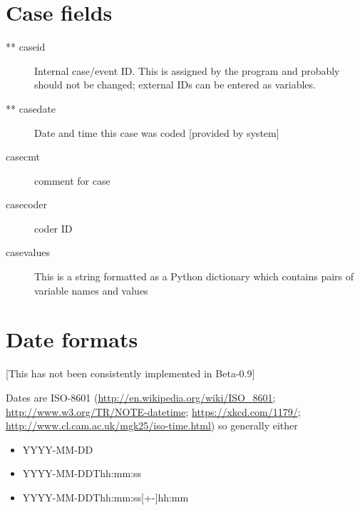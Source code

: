 \documentclass[letterpaper,10pt,english]{sphinxmanual}
\begin{document}
\section{Case fields}
\label{appendix2:case-fields}\begin{description}
\item[{** caseid}] \leavevmode
Internal case/event ID. This is assigned by the program and
probably should not be changed; external IDs can be entered as
variables.

\item[{** casedate}] \leavevmode
Date and time this case was coded {[}provided by system{]}

\item[{casecmt}] \leavevmode
comment for case

\item[{casecoder}] \leavevmode
coder ID

\item[{casevalues}] \leavevmode
This is a string formatted as a Python dictionary which contains
pairs of variable names and values

\end{description}


\section{Date formats}
\label{appendix2:date-formats}
{[}This has not been consistently implemented in Beta-0.9{]}

Dates are ISO-8601 (\href{http://en.wikipedia.org/wiki/ISO\_8601}{http://en.wikipedia.org/wiki/ISO\_8601};
\href{http://www.w3.org/TR/NOTE-datetime}{http://www.w3.org/TR/NOTE-datetime}; \href{https://xkcd.com/1179/}{https://xkcd.com/1179/};
\href{http://www.cl.cam.ac.uk/mgk25/iso-time.html}{http://www.cl.cam.ac.uk/mgk25/iso-time.html}) so generally either
\begin{itemize}
\item {} 
YYYY-MM-DD

\item {} 
YYYY-MM-DDThh:mm:ss

\item {} 
YYYY-MM-DDThh:mm:ss{[}+-{]}hh:mm

\end{itemize}
\end{document}
